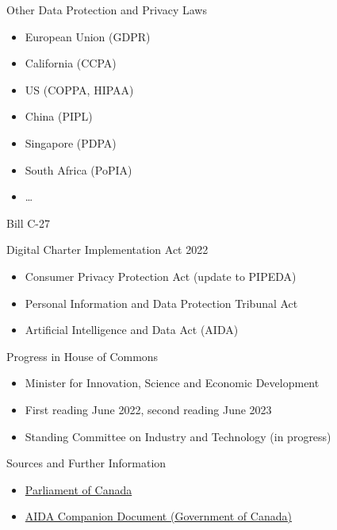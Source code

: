 \documentclass[ignorenonframetext,xcolor=x11names]{beamer}
\begin{document}
\begin{frame}[label=full]{Other Data Protection and Privacy Laws}
\begin{itemize}
   \item European Union (GDPR)
   \item California (CCPA)
   \item US (COPPA, HIPAA)
   \item China (PIPL)
   \item Singapore (PDPA)
   \item South Africa (PoPIA)
   \item \ldots
\end{itemize}
\end{frame}


\begin{frame}[label=advanced]{Bill C-27}
\begin{block}{Digital Charter Implementation Act 2022}
\begin{itemize}
   \item Consumer Privacy Protection Act (update to PIPEDA)
   \item Personal Information and Data Protection Tribunal Act
   \item Artificial Intelligence and Data Act (AIDA)
\end{itemize}
\end{block}
\begin{block}{Progress in House of Commons}
\begin{itemize}
   \item Minister for Innovation, Science and Economic Development
   \item First reading June 2022, second reading June 2023
   \item Standing Committee on Industry and Technology (in progress)
\end{itemize}
\end{block}

\begin{block}{Sources and Further Information}
\begin{itemize}
\item \href{https://www.parl.ca/legisinfo/en/bill/44-1/c-27}{Parliament of Canada}
\item \href{https://ised-isde.canada.ca/site/innovation-better-canada/en/artificial-intelligence-and-data-act-aida-companion-document}{AIDA Companion Document (Government of Canada)}
\end{itemize}
\end{block}
\end{frame}
\end{document}
